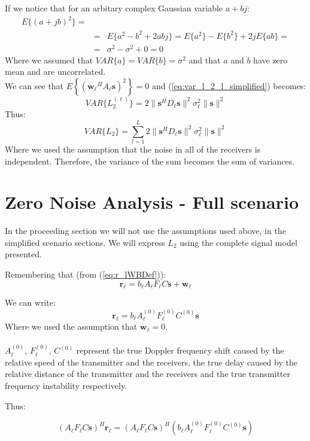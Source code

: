 If we notice that for an arbitary complex Gaussian variable $a+bj$:
\begin{eqnarray*}
E\{(a+jb)^2\} = \\
&=& E\{a^2-b^2+2abj \}= E\{a^2\}-E\{b^2\} +2jE\{ab\}= \\
&=& \sigma^2-\sigma^2+0 = 0
\end{eqnarray*}
Where we assumed that $VAR\{a\} = VAR \{b\} = \sigma^2$ and that $a$ and $b$ have zero mean and are uncorrelated.\\
We can see that $E\left\{(\mathbf{w_\ell}^H A_\ell \mathbf{s})^2\right\}=0$  and (\ref{eq:var_l_2_l_simplified})
becomes:
\begin{equation}
VAR\{L_2^{(\ell)}\} =2\| \mathbf{s}^H D_\ell \mathbf{s}\|^2\sigma_\ell^2\|\mathbf{s}\|^2 
\end{equation}
Thus:
\begin{equation}
VAR\{L_2\} = \sum_{l=1}^L 2\| \mathbf{s}^H D_\ell \mathbf{s}\|^2\sigma_\ell^2\|\mathbf{s}\|^2 
\end{equation}
Where we used the assumption that the noise in all of the receivers is independent. Therefore, the variance of the sum becomes the sum of variances.

\section{Zero Noise Analysis - Full scenario}

In the proceeding section we will not use the assumptions used above, in the simplified scenario sections.
We will express $L_2$ using the complete signal model presented.

Remembering that (from (\ref{eq:r_lWBDef})):
 $$\mathbf{r_\ell}=b_\ell A_\ell F_\ell C \mathbf{s} + \mathbf{w_\ell}$$ 
 
 We can write:
\begin{equation}
\mathbf{r_\ell}= b_\ell A_\ell^{(0)} F_\ell^{(0)} C^{(0)} \mathbf{s}
\end{equation}
Where we used the assumption that $\mathbf{w}_\ell=0$. 
\\ \\
$A^{(0)}_\ell$, $F_\ell^{(0)}$, $C^{(0)}$ represent the true Doppler frequency shift caused by the relative speed of the transmitter and the receivers, the true delay caused by the relative distance of the transmitter and the receivers and the true transmitter frequency instability respectively.

Thus:

\begin{equation}
\label{eq:analysis1}
(A_\ell F_\ell C \mathbf{s})^H\mathbf{r_\ell}=(A_\ell F_\ell C\mathbf{s})^H(b_\ell A_\ell^{(0)} F_\ell^{(0)} C^{(0)} \mathbf{s})
\end{equation}

